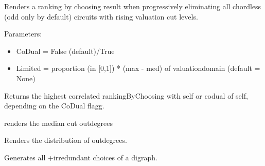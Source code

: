 \documentclass[letterpaper,10pt,english]{sphinxmanual}
\begin{document}
\begin{fulllineitems}
\begin{fulllineitems}
\end{fulllineitems}


\begin{fulllineitems}
\label{techDoc:digraphs.Digraph.optimalRankingByChoosing}
Renders a ranking by choosing result when progressively eliminating
all chordless (odd only by default) circuits with rising valuation cut levels.

Parameters:
\begin{itemize}
\item {} 
CoDual = False (default)/True

\item {} 
Limited = proportion (in {[}0,1{]}) * (max - med) of valuationdomain (default = None)

\end{itemize}

Returns the highest correlated rankingByChoosing with self or 
codual of self, depending on the CoDual flagg.

\end{fulllineitems}


\begin{fulllineitems}
\label{techDoc:digraphs.Digraph.outDegrees}
renders the median cut outdegrees

\end{fulllineitems}


\begin{fulllineitems}
\label{techDoc:digraphs.Digraph.outDegreesDistribution}
Renders the distribution of outdegrees.

\end{fulllineitems}


\begin{fulllineitems}
\label{techDoc:digraphs.Digraph.plusirredundant}
Generates all +irredundant choices of a digraph.


\end{fulllineitems}
\end{fulllineitems}
\end{document}
